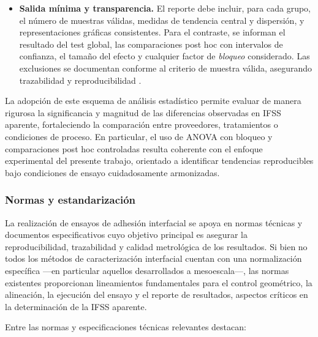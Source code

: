 \begin{itemize}
  \item \textbf{Salida mínima y transparencia.}
  El reporte debe incluir, para cada grupo, el número de muestras válidas, medidas de tendencia central
  y dispersión, y representaciones gráficas consistentes. Para el contraste, se informan el resultado
  del test global, las comparaciones post hoc con intervalos de confianza, el tamaño del efecto y
  cualquier factor de \emph{bloqueo} considerado. Las exclusiones se documentan conforme al criterio de
  muestra válida, asegurando trazabilidad y reproducibilidad \cite{ISO19375,DINSPEC19289,Liu2021}.
\end{itemize}

\noindent
La adopción de este esquema de análisis estadístico permite evaluar de manera rigurosa la significancia
y magnitud de las diferencias observadas en IFSS aparente, fortaleciendo la comparación entre
proveedores, tratamientos o condiciones de proceso. En particular, el uso de ANOVA con bloqueo y
comparaciones post hoc controladas resulta coherente con el enfoque experimental del presente trabajo,
orientado a identificar tendencias reproducibles bajo condiciones de ensayo cuidadosamente
armonizadas.

\subsubsection{Normas y estandarización}

La realización de ensayos de adhesión interfacial se apoya en normas técnicas y documentos
especificativos cuyo objetivo principal es asegurar la reproducibilidad, trazabilidad y calidad
metrológica de los resultados. Si bien no todos los métodos de caracterización interfacial cuentan
con una normalización específica —en particular aquellos desarrollados a mesoescala—, las normas
existentes proporcionan lineamientos fundamentales para el control geométrico, la alineación, la
ejecución del ensayo y el reporte de resultados, aspectos críticos en la determinación de la IFSS
aparente.

Entre las normas y especificaciones técnicas relevantes destacan:

